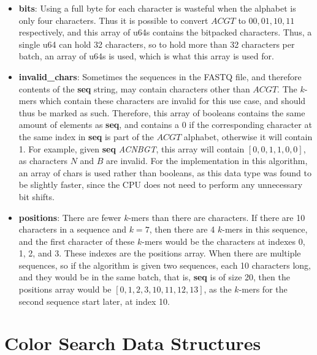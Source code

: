 \begin{itemize}
  \item \textbf{bits}: Using a full byte for each character is wasteful when the alphabet is only four characters. Thus it is possible to convert $ACGT$ to $00, 01, 10, 11$ respectively, and this array of u64s contains the bitpacked characters. Thus, a single u64 can hold 32 characters, so to hold more than 32 characters per batch, an array of u64s is used, which is what this array is used for.
  \item \textbf{invalid\_chars}: Sometimes the sequences in the FASTQ file, and therefore contents of the \textbf{seq} string, may contain characters other than $ACGT$. The $k$-mers which contain these characters are invalid for this use case, and should thus be marked as such. Therefore, this array of booleans contains the same amount of elements as \textbf{seq}, and contains a 0 if the corresponding character at the same index in \textbf{seq} is part of the $ACGT$ alphabet, otherwise it will contain 1. For example, given \textbf{seq} \textit{ACNBGT}, this array will contain $[0, 0, 1, 1, 0, 0]$, as characters $N$ and $B$ are invalid. For the implementation in this algorithm, an array of chars is used rather than booleans, as this data type was found to be slightly faster, since the CPU does not need to perform any unnecessary bit shifts.
  \item \textbf{positions}: There are fewer $k$-mers than there are characters. If there are 10 characters in a sequence and $k=7$, then there are 4 $k$-mers in this sequence, and the first character of these $k$-mers would be the characters at indexes 0, 1, 2, and 3. These indexes are the positions array. When there are multiple sequences, so if the algorithm is given two sequences, each 10 characters long, and they would be in the same batch, that is, \textbf{seq} is of size 20, then the positions array would be $[0, 1, 2, 3, 10, 11, 12, 13]$, as the $k$-mers for the second sequence start later, at index 10.
\end{itemize}

\section{Color Search Data Structures}\label{app:ColorSearchDataStructures}

